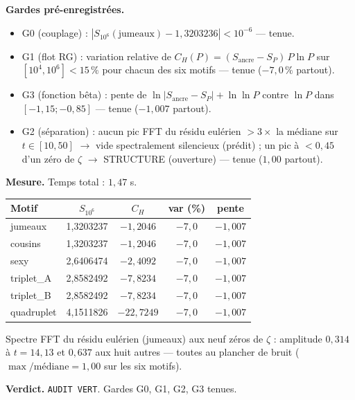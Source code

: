 \documentclass[11pt,a4paper]{article}
\begin{document}
\textbf{Gardes pré-enregistrées.}
\begin{itemize}
\item G0 (couplage) : $|S_{10^6}(\text{jumeaux}) - 1{,}3203236| < 10^{-6}$ --- tenue.
\item G1 (flot RG) : variation relative de $C_H(P) = (S_{\text{ancre}} - S_P)\,P\ln P$ sur $[10^4, 10^6] < 15\,\%$ pour chacun des six motifs --- tenue ($-7{,}0\,\%$ partout).
\item G3 (fonction bêta) : pente de $\ln|S_{\text{ancre}} - S_P| + \ln\ln P$ contre $\ln P$ dans $[-1{,}15 ; -0{,}85]$ --- tenue ($-1{,}007$ partout).
\item G2 (séparation) : aucun pic FFT du résidu eulérien $> 3\times$ la médiane sur $t \in [10, 50]$ $\to$ vide spectralement silencieux (prédit) ; un pic à $< 0{,}45$ d'un zéro de $\zeta$ $\to$ STRUCTURE (ouverture) --- tenue ($1{,}00$ partout).
\end{itemize}

\textbf{Mesure.} Temps total : $1{,}47$ s.

\begin{center}
\begin{tabular}{lcccc}
\hline
Motif & $S_{10^6}$ & $C_H$ & var (\%) & pente \\
\hline
jumeaux    & 1{,}3203237 & $-1{,}2046$  & $-7{,}0$ & $-1{,}007$ \\
cousins    & 1{,}3203237 & $-1{,}2046$  & $-7{,}0$ & $-1{,}007$ \\
sexy       & 2{,}6406474 & $-2{,}4092$  & $-7{,}0$ & $-1{,}007$ \\
triplet\_A & 2{,}8582492 & $-7{,}8234$  & $-7{,}0$ & $-1{,}007$ \\
triplet\_B & 2{,}8582492 & $-7{,}8234$  & $-7{,}0$ & $-1{,}007$ \\
quadruplet & 4{,}1511826 & $-22{,}7249$ & $-7{,}0$ & $-1{,}007$ \\
\hline
\end{tabular}
\end{center}

Spectre FFT du résidu eulérien (jumeaux) aux neuf zéros de $\zeta$ :
amplitude $0{,}314$ à $t = 14{,}13$ et $0{,}637$ aux huit autres --- toutes
au plancher de bruit ($\max/\text{médiane} = 1{,}00$ sur les six motifs).

\textbf{Verdict.} \texttt{AUDIT VERT}. Gardes G0, G1, G2, G3 tenues.
\end{document}
